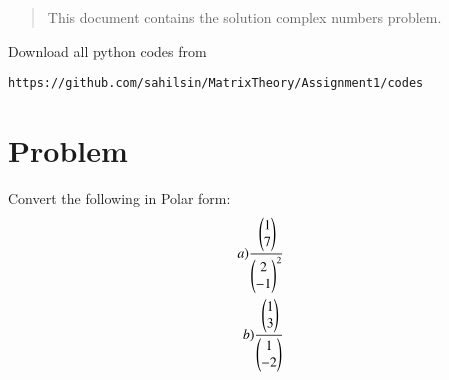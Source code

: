 \begin{enumerate}[label=\thesection.\arabic*.,ref=\thesection.\theenumi]

\begin{abstract}
This document contains the solution complex numbers problem.
\end{abstract}
Download all python codes from 
%
\begin{lstlisting}
https://github.com/sahilsin/MatrixTheory/Assignment1/codes
\end{lstlisting}
\section{Problem}
Convert the following in Polar form:
\begin{align}
        a)  \cfrac{\begin{pmatrix}1 \\ 7\end{pmatrix}}{\begin{pmatrix}2 \\ -1\end{pmatrix}^{2}}
\\
        b)  \cfrac{\begin{pmatrix}1 \\ 3\end{pmatrix}}{\begin{pmatrix}1 \\ -2\end{pmatrix}}
\end{align}

\end{enumerate}
